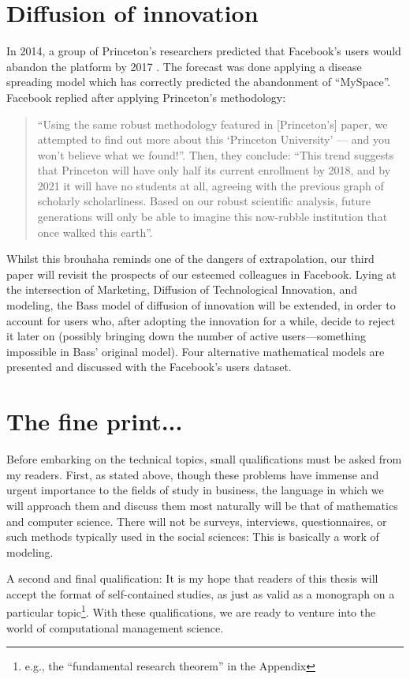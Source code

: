 \section{Diffusion of innovation}

In 2014, a group of Princeton's researchers predicted that Facebook's users would abandon the platform by 2017 \citep{cannarella2014epidemiological}. The forecast was done applying a disease spreading model which has correctly predicted the abandonment of ``MySpace''. Facebook replied after applying Princeton's methodology:

\begin{quote}
    ``Using the same robust methodology featured in [Princeton's] paper, we attempted to find out more about this `Princeton University' --- and you won't believe what we found!''. Then, they conclude: ``This trend suggests that Princeton will have only half its current enrollment by 2018, and by 2021 it will have no students at all, agreeing with the previous graph of scholarly scholarliness. Based on our robust scientific analysis, future generations will only be able to imagine this now-rubble institution that once walked this earth''.
\end{quote}


Whilst this brouhaha reminds one of the dangers of extrapolation, our third paper will revisit the prospects of our esteemed colleagues in Facebook. Lying at the intersection of Marketing, Diffusion of Technological Innovation, and modeling, the Bass model of diffusion of innovation will be extended, in order to account for users who, after adopting the innovation for a while, decide to reject it later on (possibly bringing down the number of active users---something impossible in Bass' original model). Four alternative mathematical models are presented and discussed with the Facebook's users dataset.

\section{The fine print...}

Before embarking on the technical topics, small qualifications must be asked from my readers. First, as stated above, though these problems have immense and urgent importance to the fields of study in business, the language in which we will approach them and discuss them most naturally will be that of mathematics and computer science.  There will not be surveys, interviews, questionnaires, or such methods typically used in the social sciences: This is basically a work of modeling.

A second and final qualification: It is my hope that readers of this thesis will accept the format of self-contained studies, as just as valid as a monograph on a particular topic\footnote{e.g., the ``fundamental research theorem'' in the Appendix}.  With these qualifications, we are ready to venture into the world of computational management science.
